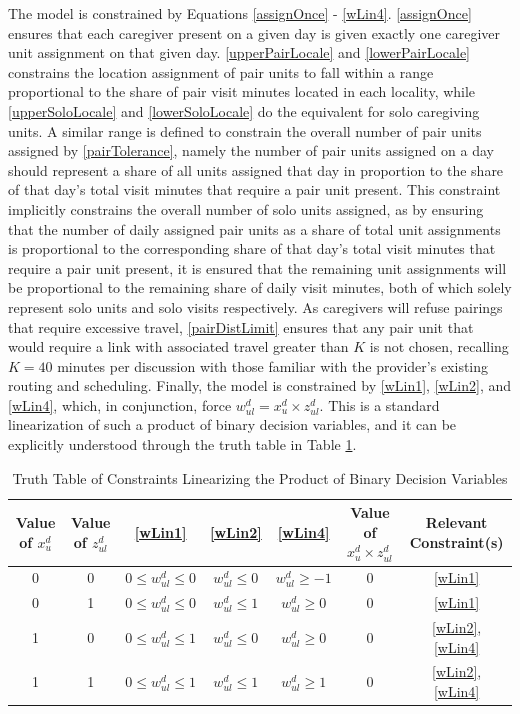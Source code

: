 \documentclass[11pt,twoside]{article}
\numberwithin{Theorem}{section}
\numberwithin{Definition}{section}
\numberwithin{Lemma}{section}
\numberwithin{Algorithm}{section}
\numberwithin{equation}{section}
\begin{document}
The model is constrained by Equations \eqref{assignOnce} - \eqref{wLin4}. \eqref{assignOnce} ensures that each caregiver present on a given day is given exactly one caregiver unit assignment on that given day. \eqref{upperPairLocale} and \eqref{lowerPairLocale} constrains the location assignment of pair units to fall within a range proportional to the share of pair visit minutes located in each locality, while \eqref{upperSoloLocale} and \eqref{lowerSoloLocale} do the equivalent for solo caregiving units. A similar range is defined to constrain the overall number of pair units assigned by \eqref{pairTolerance}, namely the number of pair units assigned on a day should represent a share of all units assigned that day in proportion to the share of that day's total visit minutes that require a pair unit present. This constraint implicitly constrains the overall number of solo units assigned, as by ensuring that the number of daily assigned pair units as a share of total unit assignments is proportional to the corresponding share of that day's total visit minutes that require a pair unit present, it is ensured that the remaining unit assignments will be proportional to the remaining share of daily visit minutes, both of which solely represent solo units and solo visits respectively. As caregivers will refuse pairings that require excessive travel, \eqref{pairDistLimit} ensures that any pair unit that would require a link with associated travel greater than $K$ is not chosen, recalling $K = 40$ minutes per discussion with those familiar with the provider's existing routing and scheduling. Finally, the model is constrained by \eqref{wLin1}, \eqref{wLin2}, and \eqref{wLin4}, which, in conjunction, force $w_{ul}^d = x_u^d \times z_{ul}^d$. This is a standard linearization of such a product of binary decision variables, and it can be explicitly understood through the truth table in Table \ref{tab:lintruth}.

\begin{table}[H]
	\setlength{\tabcolsep}{3pt}
	\begin{center}
		\caption{Truth Table of Constraints Linearizing the Product of Binary Decision Variables}
		\label{tab:lintruth}
		\begin{tabular}{ccccccc}
			Value of $x_u^d$ & Value of $z_{ul}^d$ & \eqref{wLin1} & \eqref{wLin2} & \eqref{wLin4} & Value of $x_u^d \times z_{ul}^d$ & Relevant Constraint(s)\\
			\toprule
			0 & 0 & $0 \leq w_{ul}^d \leq 0$ & $w_{ul}^d \leq 0$ & $w_{ul}^d \geq -1$ & 0 & \eqref{wLin1} \\
			0 & 1 & $0 \leq w_{ul}^d \leq 0$ & $w_{ul}^d \leq 1$ & $w_{ul}^d \geq 0$ & 0 & \eqref{wLin1} \\
			1 & 0 & $0 \leq w_{ul}^d \leq 1$ & $w_{ul}^d \leq 0$ & $w_{ul}^d \geq 0$ & 0 & \eqref{wLin2}, \eqref{wLin4}\\
			1 & 1 & $0 \leq w_{ul}^d \leq 1$ & $w_{ul}^d \leq 1$ & $w_{ul}^d \geq 1$ & 0 & \eqref{wLin2}, \eqref{wLin4}\\
		\end{tabular}
	\end{center}
\end{table}
\end{document}
